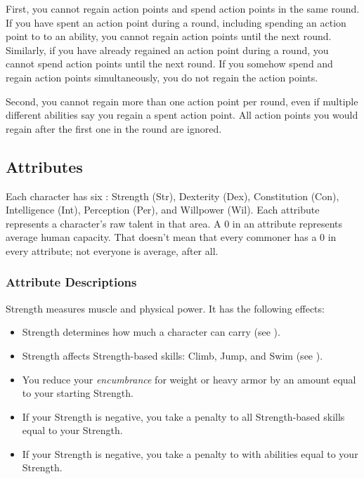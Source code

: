             First, you cannot regain action points and spend action points in the same round.
            If you have spent an action point during a round, including spending an action point to  to an ability, you cannot regain action points until the next round.
            Similarly, if you have already regained an action point during a round, you cannot spend action points until the next round.
            If you somehow spend and regain action points simultaneously, you do not regain the action points.

            Second, you cannot regain more than one action point per round, even if multiple different abilities say you regain a spent action point.
            All action points you would regain after the first one in the round are ignored.

    \subsection{Attributes}\label{Attributes}

        Each character has six : Strength (Str), Dexterity (Dex), Constitution (Con), Intelligence (Int), Perception (Per), and Willpower (Wil).
        Each attribute represents a character's raw talent in that area.
        A 0 in an attribute represents average human capacity.
        That doesn't mean that every commoner has a 0 in every attribute; not everyone is average, after all.

        \subsubsection{Attribute Descriptions}

            \label{Strength}
                Strength measures muscle and physical power.
                It has the following effects:
                \begin{itemize}
                    \item Strength determines how much a character can carry (see ).
                    \item Strength affects Strength-based skills: Climb, Jump, and Swim (see ).
                    \item You reduce your \textit{encumbrance} for weight or heavy armor by an amount equal to your starting Strength.
                    \item If your Strength is negative, you take a penalty to all Strength-based skills equal to your Strength.
                    \item If your Strength is negative, you take a penalty to  with  abilities equal to your Strength.
                \end{itemize}

